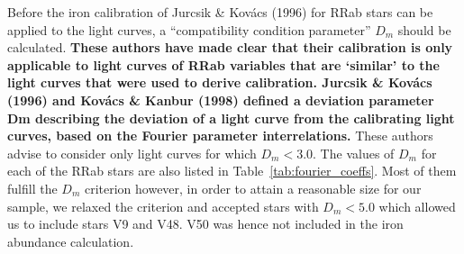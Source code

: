 \documentclass[journal]{rmaa}
\newcommand{\1}{\'{\i}}
\begin{document}
Before the iron calibration of Jurcsik \&
Kov\'acs (1996) for RRab stars can be applied to the light curves, a
``compatibility condition parameter'' $D_m$ should be calculated. {\bf These
authors have made clear that their calibration is only applicable to light curves of
RRab variables that are ‘similar’ to the light curves
that were used to derive calibration. Jurcsik \& Kov\'acs (1996) and  Kov\'acs \&
Kanbur (1998) defined a deviation parameter Dm describing the deviation
of a light curve from the calibrating light curves, based on the Fourier parameter
interrelations.}  These authors advise to
consider only light curves for which $D_m < 3.0$. The values of $D_m$ for each of the
RRab stars are also listed in Table~\ref{tab:fourier_coeffs}. Most of them
fulfill the $D_m$ criterion however, in order to attain a reasonable
size for our sample, we relaxed the criterion and accepted stars with
$D_m < 5.0$ which allowed us to include stars V9 and V48. V50 was hence not included
in the iron abundance calculation.
\end{document}
